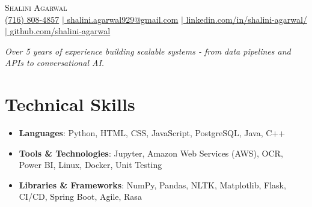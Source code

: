 \documentclass[letterpaper,11pt]{article}
\newcommand{\resumeSubHeadingListStart}{\begin{itemize}[leftmargin=0.0in, label={}]}
\newcommand{\resumeSubHeadingListEnd}{\end{itemize}}
\begin{document}
\begin{center}
    {\Huge \scshape Shalini Agarwal} \\ \vspace{1pt}
    \small \href{tel:7168084857}{(716) 808-4857}
    \href{shalini.agarwal929@gmail.com}{$\vert$   {shalini.agarwal929@gmail.com}}
    \href{https://www.linkedin.com/in/shalini-agarwal/}{$\vert$  {linkedin.com/in/shalini-agarwal/}}
    \href{https://github.com/shalini-agarwal}{$\vert$ {github.com/shalini-agarwal}}
    \vspace{-4pt}
\end{center}
\begin{center}
\textit{Over 5 years of experience building scalable systems - from data pipelines and APIs to conversational AI.} 
\end{center}
\vspace{-14pt}
\section{Technical Skills}
\resumeSubHeadingListStart
    \item{\textbf{Languages}{: Python, HTML, CSS, JavaScript, PostgreSQL, Java, C++}}
    \vspace{-5pt}
    \item{\textbf{Tools \& Technologies}{: Jupyter, Amazon Web Services (AWS), OCR, Power BI, Linux, Docker, Unit Testing}}
    \vspace{-5pt}
    \item{\textbf{Libraries \& Frameworks}{: NumPy, Pandas, NLTK, Matplotlib, Flask, CI/CD, Spring Boot, Agile, Rasa}}
 \resumeSubHeadingListEnd
\vspace{-14pt}
\end{document}
